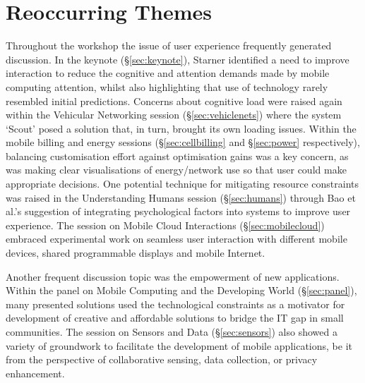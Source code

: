 \section{Reoccurring Themes}
\label{sec:keythemes}

Throughout the workshop the issue of user experience frequently generated 
discussion. In the keynote (\S\ref{sec:keynote}), Starner identified a need 
to improve interaction to reduce the cognitive and attention demands made by 
mobile computing attention, whilst also highlighting that use of technology 
rarely resembled initial 
predictions. Concerns about cognitive load were raised again within the Vehicular 
Networking session (\S\ref{sec:vehiclenets}) where the system `Scout' posed 
a solution that, in turn, brought its own loading issues. Within the mobile 
billing and energy sessions (\S\ref{sec:cellbilling} and \S\ref{sec:power} 
respectively), balancing customisation effort against optimisation gains was a 
key concern, as was making clear visualisations of energy\slash network
use so that user could make appropriate decisions. One potential technique for 
mitigating resource constraints was raised in the Understanding Humans session 
(\S\ref{sec:humans}) through Bao et al.'s suggestion of integrating
psychological factors into systems to improve user experience. The
session on Mobile Cloud Interactions (\S\ref{sec:mobilecloud}) embraced
experimental work on seamless user interaction with different mobile
devices, shared programmable displays and mobile Internet.

Another frequent discussion topic was the empowerment of new
applications. Within the panel on Mobile Computing and the Developing
World (\S\ref{sec:panel}), many presented solutions used the
technological constraints as a motivator for development of creative and
affordable solutions to bridge the IT gap in small communities. The
session on Sensors and Data (\S\ref{sec:sensors}) also showed a variety
of groundwork to facilitate the development of mobile applications,
be it from the perspective of collaborative sensing, data collection,
or privacy enhancement.


